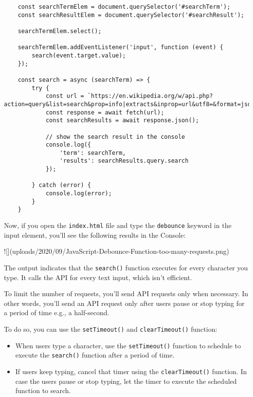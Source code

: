 \documentclass[11pt]{article}
\begin{document}
\begin{lstlisting}
    const searchTermElem = document.querySelector('#searchTerm');
    const searchResultElem = document.querySelector('#searchResult');

    searchTermElem.select();

    searchTermElem.addEventListener('input', function (event) {
        search(event.target.value);
    });

    const search = async (searchTerm) => {
        try {
            const url = `https://en.wikipedia.org/w/api.php?action=query&list=search&prop=info|extracts&inprop=url&utf8=&format=json&origin=*&srlimit=10&srsearch=${searchTerm}`;
            const response = await fetch(url);
            const searchResults = await response.json();

            // show the search result in the console
            console.log({
                'term': searchTerm,
                'results': searchResults.query.search
            });

        } catch (error) {
            console.log(error);
        }
    }
\end{lstlisting}

\noindent
Now, if you open the \verb|index.html| file and type the \verb|debounce| keyword in
the input element, you'll see the following results in the Console:

![](uploads/2020/09/JavaScript-Debounce-Function-too-many-requests.png)

\noindent
The output indicates that the \verb|search()| function executes for every
character you type. It calls the API for every text input,
which isn't efficient.
\newline

\noindent
To limit the number of requests, you'll send API requests only when
necessary. In other words, you'll send an API request only after users
pause or stop typing for a period of time e.g., a half-second.
\newline

\noindent
To do so, you can use the \verb|setTimeout()| and \verb|clearTimeout()| function:

\begin{itemize}
\item When users type a character, use the \verb|setTimeout()| function to schedule
to execute the \verb|search()| function after a period of time.
\item If users keep typing, cancel that timer using the \verb|clearTimeout()| function.
In case the users pause or stop typing, let the timer to execute the
scheduled function to search.
\end{itemize}
\end{document}
